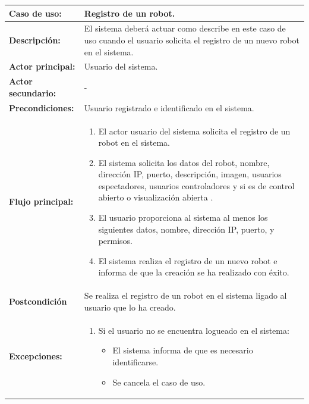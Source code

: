 \begin{table}[H]
  \begin{center}
    \begin{tabular}{|p{3.5cm}|p{10cm}|}
      \hline
      {\textbf{Caso de uso:}} & { Registro de un robot.} \\
      \hline
      {\textbf{Descripción:}} & { El sistema deberá actuar como describe en este caso de uso cuando el usuario solicita el registro de un nuevo robot en el sistema.} \\
     \hline
      {\textbf{Actor principal:}} & { Usuario del sistema.} \\
      \hline
      {\textbf{Actor secundario:}} & { - } \\
      \hline
      {\textbf{Precondiciones:}} & { Usuario registrado e identificado en el sistema. } \\
     \hline   
    {\textbf{Flujo principal:}} & { 
      \begin{enumerate}
	\item El actor usuario del sistema solicita el registro de un robot en el sistema.
	\item El sistema solicita los datos del robot, nombre, dirección IP, puerto, descripción, imagen, usuarios espectadores, usuarios controladores y si es de control abierto o visualización abierta .
	\item El usuario proporciona al sistema al menos los siguientes datos, nombre, dirección IP, puerto, y permisos.
	\item El sistema realiza el registro de un nuevo robot e informa de que la creación se ha realizado con éxito.
      \end{enumerate}
      } \\
     \hline
     {\textbf{Postcondición}} & {Se realiza el registro de un robot en el sistema ligado al usuario que lo ha creado.}\\
     \hline
         {\textbf{Excepciones:}} & {
         \begin{enumerate}
         
          \item Si el usuario no se encuentra logueado en el sistema:
	  \begin{itemize}
	    \item El sistema informa de que es necesario identificarse.
	    \item Se cancela el caso de uso.
	  \end{itemize}
         

\end{enumerate}}
\end{tabular}
\end{center}
\end{table}
